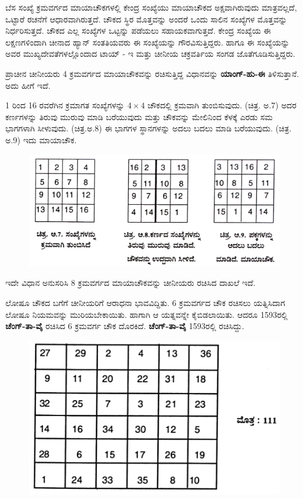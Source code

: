 ಬೆಸ ಸಂಖ್ಯೆ ಕ್ರಮವರ್ಗದ ಮಾಯಾಚೌಕಗಳಲ್ಲಿ ಕೇಂದ್ರ ಸಂಖ್ಯೆಯು ಮಾಯಾಚೌಕದ ಅಕ್ಷವಾಗಿರುವುದು ಮಾತ್ರವಲ್ಲದೆ, ಒಟ್ಟಾರೆ ರಚನೆಗೆ ಆಧಾರವಾಗಿರುತ್ತದೆ. ಚೌಕದ ಸ್ಥಿರ ಮೊತ್ತ\-ವನ್ನು ಅಂದರೆ ಒಂದು ಸಾಲಿನ ಸಂಖ್ಯೆಗಳ ಮೊತ್ತವನ್ನು ನಿರ್ಧರಿಸುತ್ತದೆ. ಚೌಕದ ಎಲ್ಲ ಸಂಖ್ಯೆಗಳ ಒಟ್ಟನ್ನು ಪಡೆಯಲು ಸಹಾಯಕವಾಗುತ್ತದೆ. ಕೇಂದ್ರ ಸಂಖ್ಯೆಯ ಈ ಲಕ್ಷಣಗಳಿಂದಾಗಿ ಚೀನಾದ ಹ್ಯಾನ್ ಸಂತತಿಯವರು ಈ ಸಂಖ್ಯೆಯನ್ನು ಗೌರವಿಸುತ್ತಿದ್ದರು. ಹಾಗೂ ಈ ಸಂಖ್ಯೆಯನ್ನು ಅವರ ಮುಖ್ಯದೇವತೆಗಳಲ್ಲೊಂದಾದ ಟಾಯ್​ - ಇ ಮತ್ತು ಚೀನೀಯ ಚಕ್ರವರ್ತಿಯ ಸಂಗಡ ಜೊತೆಗೂಡಿಸುತ್ತಿದ್ದರು.

ಪ್ರಾಚೀನ ಚೀನೀಯರು 4 ಕ್ರಮವರ್ಗದ ಮಾಯಾಚೌಕವನ್ನು ರಚಿಸುತ್ತಿದ್ದ ವಿಧಾನವನ್ನು \textbf{ಯಾಂಗ್-ಹು-ಈ} ತಿಳಿಸುತ್ತಾನೆ. ಅದು ಹೀಗೆ ಇದೆ.

1 ರಿಂದ 16 ರವರೆಗಿನ ಕ್ರಮಾಗತ ಸಂಖ್ಯೆಗಳನ್ನು $4 \times 4$ ಚೌಕದಲ್ಲಿ ಕ್ರಮವಾಗಿ ತುಂಬಿಸುವುದು. (ಚಿತ್ರ. ಅ.7) ಅದರ ಕರ್ಣಗಳನ್ನು ತಿರುವು ಮುರುವು ಮಾಡಿ ಬರೆಯುವುದು ಮತ್ತು ಚೌಕವನ್ನು ಮೇಲಿನಿಂದ ಕೆಳಕ್ಕೆ ಎರಡು ಸಮ ಭಾಗಗಳಾಗಿ ಸೀಳುವುದು. (ಚಿತ್ರ.ಅ.8) ಈ ಭಾಗಗಳ ಸ್ಥಾನಗಳನ್ನು ಅದಲು ಬದಲು ಮಾಡಿ ಬರೆಯುವುದು. (ಚಿತ್ರ. ಅ.9) ಇದು ಮಾಯಾಚೌಕ.
\begin{figure}[H]
\includegraphics{src/figures/chap9/fig9-6.jpg}
\end{figure}

ಇದೇ ವಿಧಾನ ಅನುಸರಿಸಿ 8 ಕ್ರಮವರ್ಗದ ಮಾಯಾಚೌಕವನ್ನು ಚೀನೀಯರು ರಚಿಸಿದ ದಾಖಲೆ ಇದೆ.

ಲೋಷೂ ಚೌಕದ ಬಗೆಗೆ ಚೀನೀಯರಿಗೆ ಆರಾಧನಾ ಭಾವವಿದ್ದಿತು. 6 ಕ್ರಮವರ್ಗದ ಚೌಕ ರಚಿಸಲು ಯತ್ನಿಸಿದಾಗ ಲೋಷೂ ನಿಯಮವನ್ನು ಮುರಿಯಬೇಕಾಯಿತು. ಹಾಗಾಗಿ ಆ ಯತ್ನವನ್ನೇ ಕೈಬಿಡಲಾಯಿತು. ಆದರೂ 1593ರಲ್ಲಿ \textbf{ಚೆಂಗ್-ತಾ-ವೈ} ರಚಿಸಿದ 6 ಕ್ರಮವರ್ಗ ಚೌಕ ದೊರಕಿದೆ. \textbf{ಚೆಂಗ್-ತಾ-ವೈ} 1593ರಲ್ಲಿ ರಚಿಸಿದ್ದು.
\begin{figure}[H]
\includegraphics[scale=1.1]{src/figures/chap9/fig9-7.jpg}
\end{figure}

